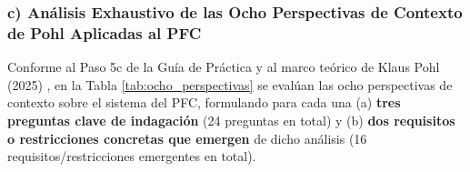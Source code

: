 
\subsubsection{c) Análisis Exhaustivo de las Ocho Perspectivas de Contexto de Pohl Aplicadas al PFC}
Conforme al Paso 5c de la Guía de Práctica y al marco teórico de Klaus Pohl (2025) \cite{pohl2025}, en la Tabla \ref{tab:ocho_perspectivas} se evalúan las ocho perspectivas de contexto sobre el sistema del PFC, formulando para cada una (a) \textbf{tres preguntas clave de indagación} (24 preguntas en total) y (b) \textbf{dos requisitos o restricciones concretas que emergen} de dicho análisis (16 requisitos/restricciones emergentes en total).

